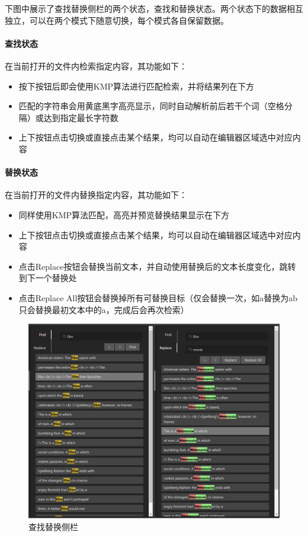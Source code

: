\documentclass[scheme = chinese]{ctexart}
\begin{document}
下图中展示了查找替换侧栏的两个状态，查找和替换状态。两个状态下的数据相互独立，可以在两个模式下随意切换，每个模式各自保留数据。

\paragraph{查找状态}
在当前打开的文件内检索指定内容，其功能如下：
\begin{itemize}
    \item 按下按钮后即会使用KMP算法进行匹配检索，并将结果列在下方
    \item 匹配的字符串会用黄底黑字高亮显示，同时自动解析前后若干个词（空格分隔）或达到指定最长字符数
    \item 上下按钮点击切换或直接点击某个结果，均可以自动在编辑器区域选中对应内容
\end{itemize}

\paragraph{替换状态}
在当前打开的文件内替换指定内容，其功能如下：
\begin{itemize}
    \item 同样使用KMP算法匹配，高亮并预览替换结果显示在下方
    \item 上下按钮点击切换或直接点击某个结果，均可以自动在编辑器区域选中对应内容
    \item 点击Replace按钮会替换当前文本，并自动使用替换后的文本长度变化，跳转到下一个替换处
    \item 点击Replace All按钮会替换掉所有可替换目标（仅会替换一次，如a替换为ab只会替换最初文本中的a，完成后会再次检索）
\end{itemize}

\begin{figure}[h]
    \centering
    \includegraphics[width=\textwidth]{images/FindAndReplace.png}
    \caption{查找替换侧栏}
\end{figure}
\end{document}
